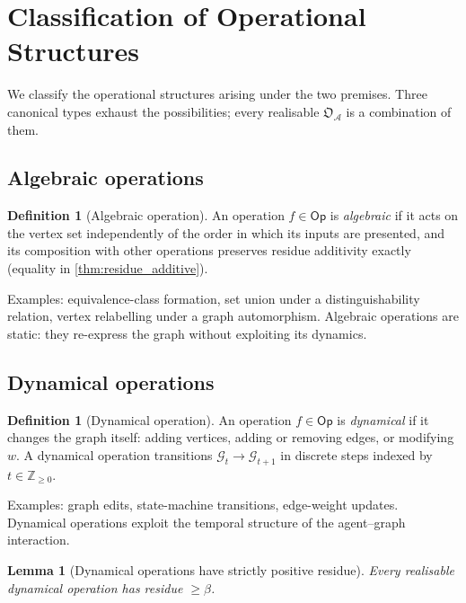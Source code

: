\documentclass[11pt,a4paper]{article}
\theoremstyle{thmstyle}
\newtheorem{lemma}[theorem]{Lemma}
\theoremstyle{definition}
\newtheorem{definition}[theorem]{Definition}
\theoremstyle{remark}
\newcommand{\Zp}{\mathbb{Z}_{\geq 0}}
\newcommand{\Graph}{\mathcal{G}}
\newcommand{\Agent}{\mathcal{A}}
\newcommand{\Op}{\mathsf{Op}}
\newcommand{\floor}{\beta}
\newcommand{\OpStr}{\mathfrak{O}}
\begin{document}
\section{Classification of Operational Structures}
\label{sec:classification}

We classify the operational structures arising under the two
premises. Three canonical types exhaust the possibilities; every
realisable $\OpStr_\Agent$ is a combination of them.

\subsection{Algebraic operations}

\begin{definition}[Algebraic operation]
\label{def:alg}
An operation $f \in \Op$ is \emph{algebraic} if it acts on the
vertex set independently of the order in which its inputs are
presented, and its composition with other operations preserves
residue additivity exactly (equality in
\cref{thm:residue_additive}).
\end{definition}

Examples: equivalence-class formation, set union under a
distinguishability relation, vertex relabelling under a graph
automorphism. Algebraic operations are static: they re-express the
graph without exploiting its dynamics.

\subsection{Dynamical operations}

\begin{definition}[Dynamical operation]
\label{def:dyn}
An operation $f \in \Op$ is \emph{dynamical} if it changes the
graph itself: adding vertices, adding or removing edges, or
modifying $w$. A dynamical operation transitions
$\Graph_t \to \Graph_{t+1}$ in discrete steps indexed by
$t \in \Zp$.
\end{definition}

Examples: graph edits, state-machine transitions, edge-weight
updates. Dynamical operations exploit the temporal structure of
the agent--graph interaction.

\begin{lemma}[Dynamical operations have strictly positive residue]
\label{lem:dyn_residue}
Every realisable dynamical operation has residue $\geq \floor$.
\end{lemma}
\end{document}
